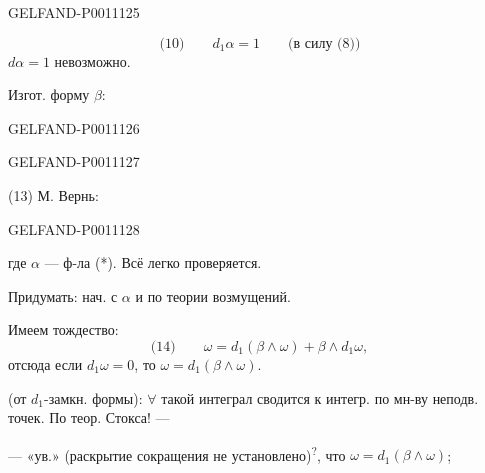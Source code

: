 \begin{GelfandAdjacentEvidence}{GELFAND-P001112}{5}

\[
\text{(10)}\qquad d_1\alpha=1\qquad\text{(в силу (8))}
\]
$d\alpha=1$ невозможно.

Изгот. форму $\beta$:
\end{GelfandAdjacentEvidence}
\begin{GelfandAdjacentEvidence}{GELFAND-P001112}{6}

\end{GelfandAdjacentEvidence}
\begin{GelfandAdjacentEvidence}{GELFAND-P001112}{7}


(13) М. Вернь:
\end{GelfandAdjacentEvidence}
\begin{GelfandAdjacentEvidence}{GELFAND-P001112}{8}

где $\alpha$ — ф-ла (*). Всё легко проверяется.

Придумать: нач. с $\alpha$ и по теории возмущений.

Имеем тождество:
\[
\text{(14)}\qquad
\omega=d_1(\beta\wedge\omega)+\beta\wedge d_1\omega,
\]
отсюда если $d_1\omega=0$, то $\omega=d_1(\beta\wedge\omega)$.

 (от $d_1$-замкн. формы):
$\forall$ такой интеграл сводится к интегр. по мн-ву неподв. точек.
По теор. Стокса! —

— «ув.» (раскрытие сокращения не установлено)\textsuperscript{?}, что $\omega=d_1(\beta\wedge\omega)$;
\end{GelfandAdjacentEvidence}

